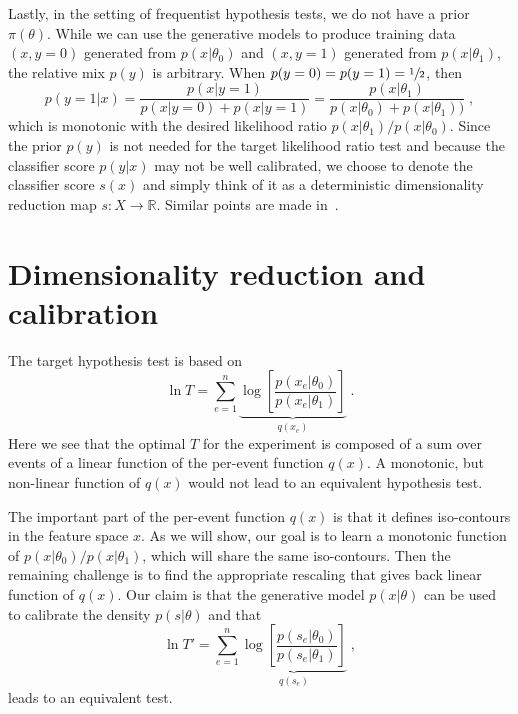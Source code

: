 \documentclass[11pt, oneside]{article}   	%
\begin{document}
Lastly, in the setting of frequentist hypothesis tests, we do not have a prior $\pi(\theta)$. 
While we can use the generative models to produce training data $(x,y=0)$ generated 
from $p(x|\theta_0)$ and $(x,y=1)$ generated from $p(x|\theta_1)$, the relative mix $p(y)$ 
is arbitrary.  When $p(y=0)=p(y=1)=\sfrac{1}{2}$, then 
\begin{equation}
p(y=1 | x) = \frac{p(x|y=1)}{p(x|y=0)+p(x|y=1)} = \frac{p(x|\theta_1)}{p(x|\theta_0)+p(x|\theta_1))} \;,
\end{equation}
which is monotonic with the desired likelihood ratio $p(x|\theta_1)/p(x|\theta_0)$.
Since the prior $p(y)$ is not needed for the target likelihood ratio test and because the classifier score $p(y|x)$ may not be well calibrated, we choose to denote the classifier score $s(x)$ and simply think of it as a deterministic dimensionality reduction map $s: X \to \mathbb{R}$.  Similar points are made in~\citep{ClaytonScott}.




\section{Dimensionality reduction and calibration}


 The target hypothesis test is based on 
\begin{equation}
\ln T =   \sum_{e=1}^n \underbrace{\log \left[ \frac {p(x_e | \theta_0) }{ p(x_e | \theta_1) } \right]}_{q(x_e)} \;.
\end{equation}
Here we see that the optimal $T$ for the experiment is composed of a sum over events of a  linear function of the per-event function $q(x)$. A monotonic, but non-linear function of $q(x)$ would not lead to an equivalent hypothesis test. 

The important part of the per-event function $q(x)$ is that it defines iso-contours in the feature space $x$. As we will show, our goal is to learn a monotonic function of $p(x|\theta_0)/p(x|\theta_1)$, which will share the same iso-contours. Then the remaining challenge is to find the appropriate rescaling that gives back  linear function of $q(x)$. Our claim is that the generative model $p(x|\theta)$ can be used to calibrate the density $p(s|\theta)$ and that
\begin{equation}
\ln T' = \sum_{e=1}^n \underbrace{\log \left[ \frac {p(s_e | \theta_0) }{ p(s_e | \theta_1) } \right]}_{q(s_e)} \;,
\end{equation}
leads to an equivalent test.
\end{document}
